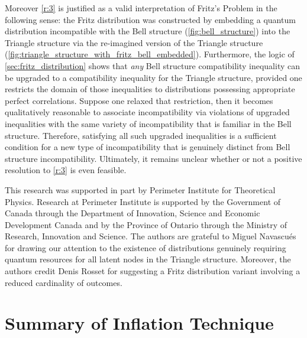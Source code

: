 \documentclass[aps, 10pt, english, twoside, pra, nofootinbib, tightenlines, longbibliography, superscriptaddress]{revtex4-1}
\begin{document}
    Moreover \ref{r:3} is justified as a valid interpretation of Fritz's Problem in the following sense: the Fritz distribution was constructed by embedding a quantum distribution incompatible with the Bell structure (\cref{fig:bell_structure}) into the Triangle structure via the re-imagined version of the Triangle structure (\cref{fig:triangle_structure_with_fritz_bell_embedded}). Furthermore, the logic of \cref{sec:fritz_distribution} shows that \textit{any} Bell structure compatibility inequality can be upgraded to a compatibility inequality for the Triangle structure, provided one restricts the domain of those inequalities to distributions possessing appropriate perfect correlations. Suppose one relaxed that restriction, then it becomes qualitatively reasonable to associate incompatibility via violations of upgraded inequalities with the same variety of incompatibility that is familiar in the Bell structure. Therefore, satisfying all such upgraded inequalities is a sufficient condition for a new type of incompatibility that is genuinely distinct from Bell structure incompatibility. Ultimately, it remains unclear whether or not a positive resolution to \ref{r:3} is even feasible.


    \begin{acknowledgments}
    This research was supported in part by Perimeter Institute for Theoretical Physics. Research at Perimeter Institute is supported by the Government of Canada through the Department of Innovation, Science and Economic Development Canada and by the Province of Ontario through the Ministry of Research, Innovation and Science. The authors are grateful to Miguel Navascués for drawing our attention to the existence of distributions genuinely requiring quantum resources for all latent nodes in the Triangle structure. Moreover, the authors credit Denis Rosset for suggesting a Fritz distribution variant involving a reduced cardinality of outcomes.
    \end{acknowledgments}

    \appendix

    \section{Summary of Inflation Technique}
    \label{sec:inflation_technique}

\end{document}
